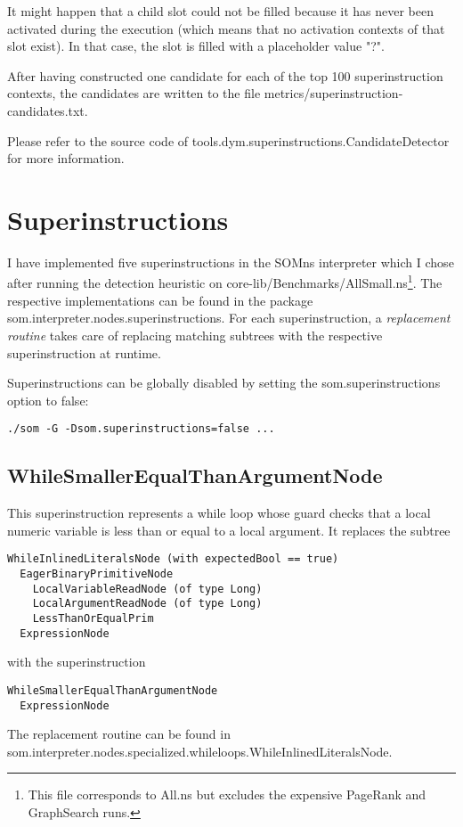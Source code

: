 \documentclass[10pt,a4paper]{article}
\begin{document}
It might happen that a child slot could not be filled because it has never been activated during the execution (which means that no activation contexts of that slot exist). In that case, the slot is filled with a placeholder value \textsf{"?"}.

After having constructed one candidate for each of the top 100 superinstruction contexts, the candidates are written to the file \textsf{metrics/superinstruction-candidates.txt}.

Please refer to the source code of \textsf{tools.dym.superinstructions.CandidateDetector} for more information.

\section{Superinstructions}\label{sec:superinst}

I have implemented five superinstructions in the SOMns interpreter which I chose after running the detection heuristic on \textsf{core-lib/Benchmarks/AllSmall.ns}\footnote{This file corresponds to \textsf{All.ns} but excludes the expensive \textsf{PageRank} and \textsf{GraphSearch} runs.}. The respective implementations can be found in the package \textsf{som.interpreter.{\allowbreak}nodes.superinstructions}. For each superinstruction, a \emph{replacement routine} takes care of replacing matching subtrees with the respective superinstruction at runtime.

Superinstructions can be globally disabled by setting the \textsf{som.superinstructions} option to \textsf{false}:

\begin{verbatim}
./som -G -Dsom.superinstructions=false ...
\end{verbatim}

\subsection{WhileSmallerEqualThanArgumentNode}

This superinstruction represents a \textsf{while} loop whose guard checks that a local numeric variable is less than or equal to a local argument. It replaces the subtree
\begin{verbatim}
WhileInlinedLiteralsNode (with expectedBool == true)
  EagerBinaryPrimitiveNode
    LocalVariableReadNode (of type Long)
    LocalArgumentReadNode (of type Long)
    LessThanOrEqualPrim
  ExpressionNode
\end{verbatim}
with the superinstruction
\begin{verbatim}
WhileSmallerEqualThanArgumentNode
  ExpressionNode
\end{verbatim}
The replacement routine can be found in \textsf{som.interpreter.nodes.specialized.whileloops{\allowbreak}.WhileInlinedLiteralsNode}.
\end{document}
